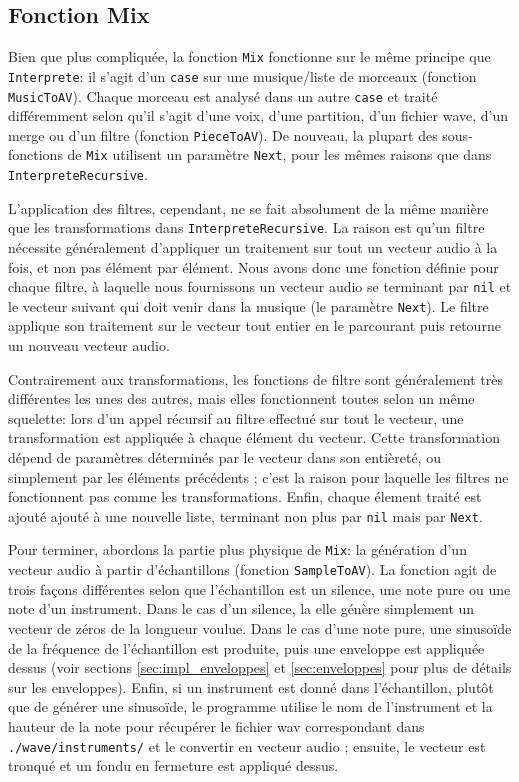 \documentclass[a4paper,12pt]{article}
\begin{document}
\subsection{Fonction Mix}
\label{sec:mix}

Bien que plus compliquée, la fonction \texttt{Mix} fonctionne sur le même principe que \texttt{Interprete}: il s'agit d'un \texttt{case} sur une musique/liste de morceaux (fonction \texttt{MusicToAV}). Chaque morceau est analysé dans un autre \texttt{case} et traité différemment selon qu'il s'agit d'une voix, d'une partition, d'un fichier wave, d'un merge ou d'un filtre (fonction \texttt{PieceToAV}). De nouveau, la plupart des sous-fonctions de \texttt{Mix} utilisent un paramètre \texttt{Next}, pour les mêmes raisons que dans \texttt{InterpreteRecursive}.

L'application des filtres, cependant, ne se fait absolument de la même manière que les transformations dans \texttt{InterpreteRecursive}. La raison est qu'un filtre nécessite généralement d'appliquer un traitement sur tout un vecteur audio à la fois, et non pas élément par élément. Nous avons donc une fonction définie pour chaque filtre, à laquelle nous fournissons un vecteur audio se terminant par \texttt{nil} et le vecteur suivant qui doit venir dans la musique (le paramètre \texttt{Next}). Le filtre applique son traitement sur le vecteur tout entier en le parcourant puis retourne un nouveau vecteur audio.

Contrairement aux transformations, les fonctions de filtre sont généralement très différentes les unes des autres, mais elles fonctionnent toutes selon un même squelette: lors d'un appel récursif au filtre effectué sur tout le vecteur, une transformation est appliquée à chaque élément du vecteur. Cette transformation dépend de paramètres déterminés par le vecteur dans son entièreté, ou simplement par les éléments précédents ; c'est la raison pour laquelle les filtres ne fonctionnent pas comme les transformations. Enfin, chaque élement traité est ajouté ajouté à une nouvelle liste, terminant non plus par \texttt{nil} mais par \texttt{Next}.

Pour terminer, abordons la partie plus \og{}physique\fg{} de \texttt{Mix}: la génération d'un vecteur audio à partir d'échantillons (fonction \texttt{SampleToAV}). La fonction agit de trois façons différentes selon que l'échantillon est un silence, une note pure ou une note d'un instrument. Dans le cas d'un silence, la elle génère simplement un vecteur de zéros de la longueur voulue. Dans le cas d'une note pure, une sinusoïde de la fréquence de l'échantillon est produite, puis une enveloppe est appliquée dessus (voir sections \ref {sec:impl_enveloppes} et \ref{sec:enveloppes} pour plus de détails sur les enveloppes). Enfin, si un instrument est donné dans l'échantillon, plutôt que de générer une sinusoïde, le programme utilise le nom de l'instrument et la hauteur de la note pour récupérer le fichier wav correspondant dans \texttt{./wave/instruments/} et le convertir en vecteur audio ; ensuite, le vecteur est tronqué et un fondu en fermeture est appliqué dessus.
\end{document}
